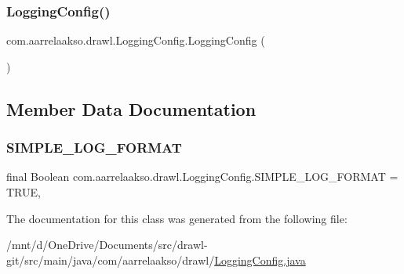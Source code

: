 \subsubsection{\texorpdfstring{Logging\+Config()}{LoggingConfig()}}
{\footnotesize\ttfamily com.\+aarrelaakso.\+drawl.\+Logging\+Config.\+Logging\+Config (\begin{DoxyParamCaption}{ }\end{DoxyParamCaption})}



\subsection{Member Data Documentation}
\mbox{\label{classcom_1_1aarrelaakso_1_1drawl_1_1_logging_config_a1cfdfab19a9fd0f78da68dc8bcce3144}} 
\subsubsection{\texorpdfstring{S\+I\+M\+P\+L\+E\+\_\+\+L\+O\+G\+\_\+\+F\+O\+R\+M\+AT}{SIMPLE\_LOG\_FORMAT}}
{\footnotesize\ttfamily final Boolean com.\+aarrelaakso.\+drawl.\+Logging\+Config.\+S\+I\+M\+P\+L\+E\+\_\+\+L\+O\+G\+\_\+\+F\+O\+R\+M\+AT = T\+R\+UE\hspace{0.3cm}{\ttfamily [static]}, {\ttfamily [private]}}



The documentation for this class was generated from the following file\+:\begin{DoxyCompactItemize}
\item 
/mnt/d/\+One\+Drive/\+Documents/src/drawl-\/git/src/main/java/com/aarrelaakso/drawl/\hyperlink{_logging_config_8java}{Logging\+Config.\+java}\end{DoxyCompactItemize}

